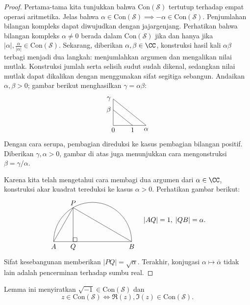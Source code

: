 \begin{proof}
	Pertama-tama kita tunjukkan bahwa $\text{Con}(\mathcal{S})$ tertutup terhadap empat operasi aritmetika. Jelas bahwa $\alpha \in \text{Con}(\mathcal{S}) \implies -\alpha \in \text{Con}(\mathcal{S})$. Penjumlahan bilangan kompleks dapat diwujudkan dengan jajargenjang. Perhatikan bahwa bilangan kompleks $\alpha \neq 0$ berada dalam $\text{Con}(\mathcal{S})$ jika dan hanya jika $|\alpha|, \frac{\alpha}{|\alpha|} \in \text{Con}(\mathcal{S})$. Sekarang, diberikan $\alpha, \beta \in \CC$, konstruksi hasil kali $\alpha\beta$ terbagi menjadi dua langkah: menjumlahkan argumen dan mengalikan nilai mutlak. Konstruksi jumlah serta selisih sudut sudah dikenal, sedangkan nilai mutlak dapat dikalikan dengan menggunakan sifat segitiga sebangun. Andaikan $\alpha, \beta > 0$; gambar berikut menghasilkan $\gamma = \alpha\beta$:
	\[\begin{tikzpicture}[baseline=(Bs.base)]
		\node (Bs) at (0, 0.68) {};
		\draw (0,0) [below] node {$0$} -- (1.7, 0) [below] node {$\alpha$} -- (0, 1.36) [left] node {$\gamma$} -- (0,0);
		\draw (1,0) [below] node {$1$} -- (0, 0.8) [left] node {$\beta$};
	\end{tikzpicture}\]
	Dengan cara serupa, pembagian direduksi ke kasus pembagian bilangan positif. Diberikan $\gamma, \alpha > 0$, gambar di atas juga menunjukkan cara mengonstruksi $\beta = \gamma/\alpha$. 

	Karena kita telah mengetahui cara membagi dua argumen dari $\alpha \in \CC$, konstruksi akar kuadrat tereduksi ke kasus $\alpha > 0$. Perhatikan gambar berikut:
	\[\begin{tikzpicture}[baseline=(Bs.base)]
		\node (Bs) at (90:1cm) {};
		\draw (0:2cm) arc [start angle=0, end angle=180, radius=2cm];
		\node (P) at (120:2cm) [above] {$P$};
		\draw (180:2cm) [below] node {$A$} -- (0:2cm) [below] node {$B$} -- (120:2cm) -- (180:2cm);
		\draw (120:2cm) -- (180:1cm) [below] node {$Q$};
		\draw (180:1cm) rectangle ++(0.2, 0.2);
	\end{tikzpicture} \quad |AQ|=1, \; |QB|=\alpha. \]
	Sifat kesebangunan memberikan $|PQ|=\sqrt{\alpha}$. Terakhir, konjugasi $\alpha \mapsto \bar{\alpha}$ tidak lain adalah pencerminan terhadap sumbu real.
\end{proof}
Lemma ini menyiratkan $\sqrt{-1} \in \text{Con}(\mathcal{S})$ dan
\[ z \in \text{Con}(\mathcal{S}) \iff \Re(z), \Im(z) \in \text{Con}(\mathcal{S}). \]

